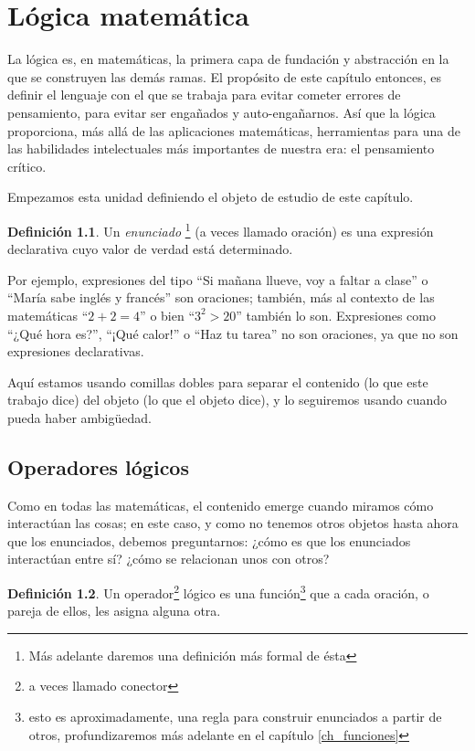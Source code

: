 \documentclass{book}
\theoremstyle{definition}
\newtheorem{df}{Definición}[chapter]
\begin{document}
\chapter{Lógica matemática}
La lógica es, en matemáticas, la primera capa de fundación y abstracción en la que se construyen las demás ramas.
El propósito de este capítulo entonces, es definir el lenguaje con el que se trabaja para evitar cometer errores de pensamiento, para evitar ser engañados y auto-engañarnos.
Así que la lógica proporciona, más allá de las aplicaciones matemáticas, herramientas para una de las habilidades intelectuales más importantes de nuestra era: el pensamiento crítico.

Empezamos esta unidad definiendo el objeto de estudio de este capítulo.
\begin{df}
	Un \emph{enunciado}
		\footnote{Más adelante daremos una definición más formal de ésta} %
		(a veces llamado oración) es una expresión declarativa cuyo valor de verdad está determinado.
\end{df}

Por ejemplo, expresiones del tipo ``Si mañana llueve, voy a faltar a clase'' o ``María sabe inglés y francés'' son oraciones; también, más al contexto de las matemáticas ``$2+2=4$'' o bien ``$3^2 > 20$'' también lo son.
Expresiones como ``¿Qué hora es?'', ``¡Qué calor!'' o ``Haz tu tarea'' no son oraciones, ya que no son expresiones declarativas.

Aquí estamos usando comillas dobles para separar el contenido (lo que este trabajo dice) del objeto (lo que el objeto dice), y lo seguiremos usando cuando pueda haber ambigüedad.

\section{Operadores lógicos}

Como en todas las matemáticas, el contenido emerge cuando miramos cómo interactúan las cosas; en este caso, y como no tenemos otros objetos hasta ahora que los enunciados, debemos preguntarnos: ¿cómo es que los enunciados interactúan entre sí? ¿cómo se relacionan unos con otros?

\begin{df}
	Un operador\footnote{a veces llamado conector} lógico es una función\footnote %
	{esto es aproximadamente, una regla para construir enunciados a partir de otros, profundizaremos más adelante en el capítulo \ref{ch_funciones}}
	que a cada oración, o pareja de ellos, les asigna alguna otra.
\end{df}
\end{document}
